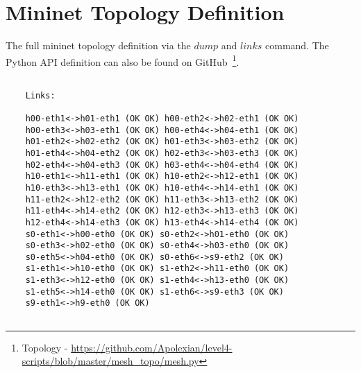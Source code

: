 \chapter{Mininet Topology Definition}\label{appendix:topo}

The full mininet topology definition via the $dump$ and $links$ command. The Python API definition can also be found on GitHub~\footnote{Topology - \url{https://github.com/Apolexian/level4-scripts/blob/master/mesh_topo/mesh.py}}.

\begin{lstlisting}[caption={Mininet $links$ on the used topology.}, label=lst:app:topo]

    Links:
    
    h00-eth1<->h01-eth1 (OK OK) h00-eth2<->h02-eth1 (OK OK) 
    h00-eth3<->h03-eth1 (OK OK) h00-eth4<->h04-eth1 (OK OK) 
    h01-eth2<->h02-eth2 (OK OK) h01-eth3<->h03-eth2 (OK OK) 
    h01-eth4<->h04-eth2 (OK OK) h02-eth3<->h03-eth3 (OK OK) 
    h02-eth4<->h04-eth3 (OK OK) h03-eth4<->h04-eth4 (OK OK) 
    h10-eth1<->h11-eth1 (OK OK) h10-eth2<->h12-eth1 (OK OK) 
    h10-eth3<->h13-eth1 (OK OK) h10-eth4<->h14-eth1 (OK OK) 
    h11-eth2<->h12-eth2 (OK OK) h11-eth3<->h13-eth2 (OK OK) 
    h11-eth4<->h14-eth2 (OK OK) h12-eth3<->h13-eth3 (OK OK) 
    h12-eth4<->h14-eth3 (OK OK) h13-eth4<->h14-eth4 (OK OK) 
    s0-eth1<->h00-eth0 (OK OK) s0-eth2<->h01-eth0 (OK OK) 
    s0-eth3<->h02-eth0 (OK OK) s0-eth4<->h03-eth0 (OK OK) 
    s0-eth5<->h04-eth0 (OK OK) s0-eth6<->s9-eth2 (OK OK) 
    s1-eth1<->h10-eth0 (OK OK) s1-eth2<->h11-eth0 (OK OK) 
    s1-eth3<->h12-eth0 (OK OK) s1-eth4<->h13-eth0 (OK OK) 
    s1-eth5<->h14-eth0 (OK OK) s1-eth6<->s9-eth3 (OK OK) 
    s9-eth1<->h9-eth0 (OK OK)
        
    \end{lstlisting}


